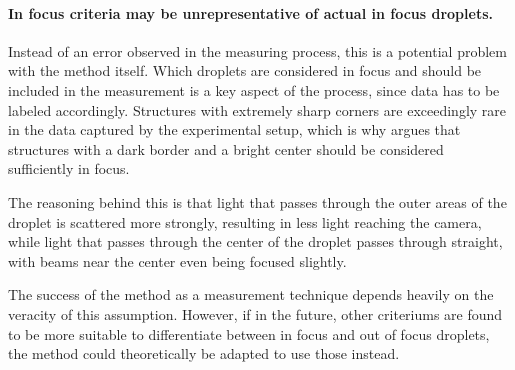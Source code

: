 \paragraph{In focus criteria may be unrepresentative of actual in focus droplets.} Instead of an error observed in the measuring process, this is a potential problem with the method itself.
Which droplets are considered in focus and should be included in the measurement is a key aspect of the process, since data has to be labeled accordingly. Structures with extremely sharp corners are exceedingly rare in the data captured by the experimental setup, which is why \cite{kapplAkustischInduzierteVernebelung2022} argues that structures with a dark border and a bright center should be considered sufficiently in focus.

The reasoning behind this is that light that passes through the outer areas of the droplet is scattered more strongly, resulting in less light reaching the camera, while light that passes through the center of the droplet passes through straight, with beams near the center even being focused slightly.

The success of the method as a measurement technique depends heavily on the veracity of this assumption. 
However, if in the future, other criteriums are found to be more suitable to differentiate between in focus and out of focus droplets, the method could theoretically be adapted to use those instead.